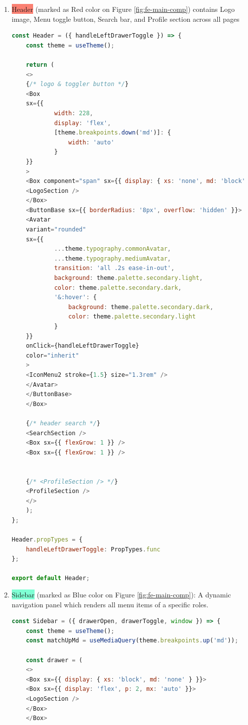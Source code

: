 	\begin{enumerate}
		\item 	\colorbox{Salmon}{Header} (marked as Red color on Figure \ref{fig:fe-main-comp}) contains Logo image, Menu toggle button, Search bar, and Profile section  across all pages
		
\begin{lstlisting}[language=Javascript, breaklines=true, caption=Frontend Header Component]
const Header = ({ handleLeftDrawerToggle }) => {
	const theme = useTheme();
	
	return (
	<>
	{/* logo & toggler button */}
	<Box
	sx={{
			width: 228,
			display: 'flex',
			[theme.breakpoints.down('md')]: {
				width: 'auto'
			}
	}}
	>
	<Box component="span" sx={{ display: { xs: 'none', md: 'block' }, flexGrow: 1 }}>
	<LogoSection />
	</Box>
	<ButtonBase sx={{ borderRadius: '8px', overflow: 'hidden' }}>
	<Avatar
	variant="rounded"
	sx={{
			...theme.typography.commonAvatar,
			...theme.typography.mediumAvatar,
			transition: 'all .2s ease-in-out',
			background: theme.palette.secondary.light,
			color: theme.palette.secondary.dark,
			'&:hover': {
				background: theme.palette.secondary.dark,
				color: theme.palette.secondary.light
			}
	}}
	onClick={handleLeftDrawerToggle}
	color="inherit"
	>
	<IconMenu2 stroke={1.5} size="1.3rem" />
	</Avatar>
	</ButtonBase>
	</Box>
	
	{/* header search */}
	<SearchSection />
	<Box sx={{ flexGrow: 1 }} />
	<Box sx={{ flexGrow: 1 }} />
	

	{/* <ProfileSection /> */}
	<ProfileSection />
	</>
	);
};

Header.propTypes = {
	handleLeftDrawerToggle: PropTypes.func
};

export default Header;
\end{lstlisting}
		
		\item 	\colorbox{Aquamarine}{Sidebar} (marked as Blue color on Figure \ref{fig:fe-main-comp}): A dynamic navigation panel which renders all menu items of a specific roles.
		
\begin{lstlisting}[language=Javascript, breaklines=true, caption=Frontend Sidebar Component]
const Sidebar = ({ drawerOpen, drawerToggle, window }) => {
	const theme = useTheme();
	const matchUpMd = useMediaQuery(theme.breakpoints.up('md'));
	
	const drawer = (
	<>
	<Box sx={{ display: { xs: 'block', md: 'none' } }}>
	<Box sx={{ display: 'flex', p: 2, mx: 'auto' }}>
	<LogoSection />
	</Box>
	</Box>
	

\end{lstlisting}
\end{enumerate}
